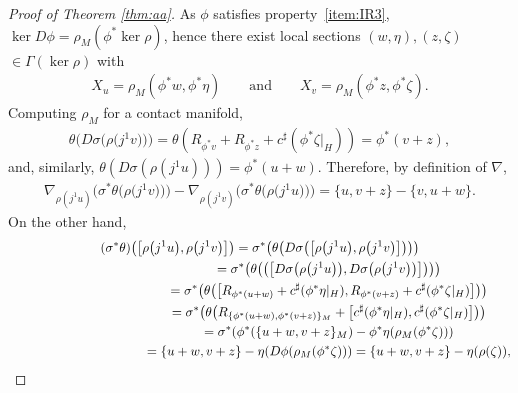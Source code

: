 \documentclass[10pt,a4paper]{amsart}
\numberwithin{equation}{section}
\begin{document}
\begin{proof}[Proof of Theorem \ref{thm:aa}]
As $\phi$ satisf\/ies property~\ref{item:IR3}, $\ker D\phi =\rho_M (\phi^* \ker \rho)$, hence there exist local sections $(w,\eta), (z,\zeta)$ $\in \Gamma(\ker \rho)$ with
\begin{gather*}
 X_u = \rho_M(\phi^*w,\phi^*\eta) \qquad \text{and} \qquad X_v = \rho_M(\phi^*z,\phi^*\zeta).
\end{gather*}
Computing $\rho_M$ for a contact manifold,
\begin{gather*}
 \theta\big(D\sigma\big(\rho\big(j^1v\big)\big)\big) =\theta(R_{\phi^*v}+R_{\phi^*z}+c^\sharp(\phi^*\zeta|_H)) = \phi^*(v + z),
\end{gather*}
and, similarly, $\theta(D\sigma(\rho(j^1u))) = \phi^*(u+w)$. Therefore, by def\/inition of ${\nabla}$,
\begin{gather} \label{eq:31}
 {\nabla}_{\rho(j^1u)}\big(\sigma^*\theta\big(\rho\big(j^1v\big)\big)\big) - {\nabla}_{\rho(j^1v)}\big(\sigma^*\theta\big(\rho\big(j^1u\big)\big)\big) = \{u,v+z\} - \{v, u + w\}.
\end{gather}
On the other hand,
\begin{gather}
(\sigma^*\theta)\big(\big[\rho\big(j^1u\big), \rho\big(j^1v\big)\big]\big) =
 \sigma^*\big(\theta\big(D\sigma \big(\big[\rho\big(j^1u\big), \rho\big(j^1v\big)\big]\big) \big)\big) \nonumber\\
\hphantom{(\sigma^*\theta)\big(\big[\rho\big(j^1u\big), \rho\big(j^1v\big)\big]\big)}{}
 = \sigma^*\big(\theta\big(\big(\big[D\sigma \big(\rho\big(j^1u\big)\big), D\sigma\big(\rho\big(j^1v\big)\big)\big]\big)\big)\big) \nonumber\\
\hphantom{(\sigma^*\theta)\big(\big[\rho\big(j^1u\big), \rho\big(j^1v\big)\big]\big)}{}
 = \sigma^*\big(\theta\big(\big[R_{\phi^*(u+w)} +
 c^{\sharp}(\phi^*\eta|_H), R_{\phi^*(v+z)} + c^{\sharp}(\phi^*\zeta|_H)\big]\big)\big) \nonumber\\
\hphantom{(\sigma^*\theta)\big(\big[\rho\big(j^1u\big), \rho\big(j^1v\big)\big]\big)}{}
 = \sigma^*\big(\theta\big(R_{\{\phi^*(u+w), \phi^*(v+z)\}_M} + \big[c^{\sharp}(\phi^*\eta|_H), c^{\sharp}(\phi^*\zeta|_H)\big]\big)\big) \nonumber\\
\hphantom{(\sigma^*\theta)\big(\big[\rho\big(j^1u\big), \rho\big(j^1v\big)\big]\big)}{}
 = \sigma^*(\phi^*(\{u+w,v+z\}_M) - \phi^*\eta(\rho_M( \phi^*\zeta)))\label{eq:32}\\
\hphantom{(\sigma^*\theta)\big(\big[\rho\big(j^1u\big), \rho\big(j^1v\big)\big]\big)}{}
 = \{u+w,v+z\} - \eta(D\phi (\rho_M(
 \phi^*\zeta))) = \{u+w,v+z\} - \eta(\rho(\zeta)), \nonumber
\end{gather}

\end{proof}
\end{document}
